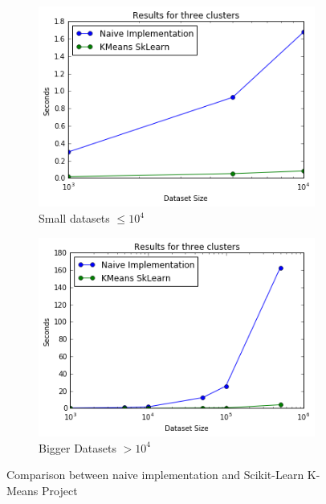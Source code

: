 \documentclass[11pt]{article}
\begin{document}
\begin{figure}[h!]
	\centering 
	\begin{subfigure}{0.48\textwidth}
		\includegraphics[width=\textwidth]{Figures/Comparison.png}
		\caption{Small datasets $\leq 10^4$}
	\end{subfigure}
	\quad
	\begin{subfigure}{0.48\textwidth}
		\includegraphics[width=\textwidth]{Figures/Comparison2.png}
		\caption{Bigger Datasets  $> 10^4$}
	\end{subfigure} 
	\caption{Comparison between naive implementation and Scikit-Learn K-Means Project}
	\label{comp}
\end{figure}

	
\end{document}
